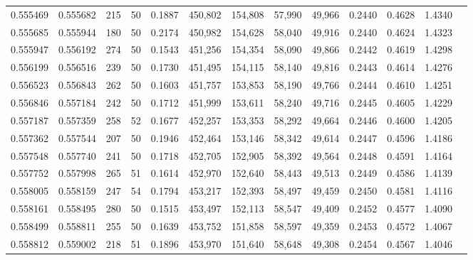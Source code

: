 \begin{tabular}{rrrrrrrrrrrrr}
0.555469 & 0.555682 &   215 &  50 &                                     0.1887 & 450,802 & 154,808 &  57,990 &  49,966 & 0.2440 & 0.4628 & 1.4340 \\
0.555685 & 0.555944 &   180 &  50 &                                     0.2174 & 450,982 & 154,628 &  58,040 &  49,916 & 0.2440 & 0.4624 & 1.4323 \\
0.555947 & 0.556192 &   274 &  50 &                                     0.1543 & 451,256 & 154,354 &  58,090 &  49,866 & 0.2442 & 0.4619 & 1.4298 \\
0.556199 & 0.556516 &   239 &  50 &                                     0.1730 & 451,495 & 154,115 &  58,140 &  49,816 & 0.2443 & 0.4614 & 1.4276 \\
0.556523 & 0.556843 &   262 &  50 &                                     0.1603 & 451,757 & 153,853 &  58,190 &  49,766 & 0.2444 & 0.4610 & 1.4251 \\
0.556846 & 0.557184 &   242 &  50 &                                     0.1712 & 451,999 & 153,611 &  58,240 &  49,716 & 0.2445 & 0.4605 & 1.4229 \\
0.557187 & 0.557359 &   258 &  52 &                                     0.1677 & 452,257 & 153,353 &  58,292 &  49,664 & 0.2446 & 0.4600 & 1.4205 \\
0.557362 & 0.557544 &   207 &  50 &                                     0.1946 & 452,464 & 153,146 &  58,342 &  49,614 & 0.2447 & 0.4596 & 1.4186 \\
0.557548 & 0.557740 &   241 &  50 &                                     0.1718 & 452,705 & 152,905 &  58,392 &  49,564 & 0.2448 & 0.4591 & 1.4164 \\
0.557752 & 0.557998 &   265 &  51 &                                     0.1614 & 452,970 & 152,640 &  58,443 &  49,513 & 0.2449 & 0.4586 & 1.4139 \\
0.558005 & 0.558159 &   247 &  54 &                                     0.1794 & 453,217 & 152,393 &  58,497 &  49,459 & 0.2450 & 0.4581 & 1.4116 \\
0.558161 & 0.558495 &   280 &  50 &                                     0.1515 & 453,497 & 152,113 &  58,547 &  49,409 & 0.2452 & 0.4577 & 1.4090 \\
0.558499 & 0.558811 &   255 &  50 &                                     0.1639 & 453,752 & 151,858 &  58,597 &  49,359 & 0.2453 & 0.4572 & 1.4067 \\
0.558812 & 0.559002 &   218 &  51 &                                     0.1896 & 453,970 & 151,640 &  58,648 &  49,308 & 0.2454 & 0.4567 & 1.4046 \\

\end{tabular}
